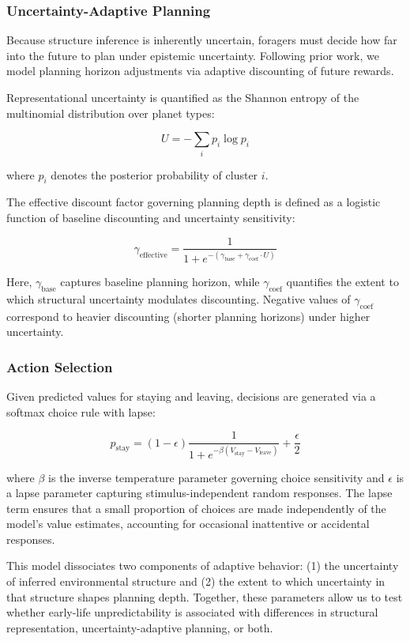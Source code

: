 \documentclass[12pt]{article}
\begin{document}
\subsubsection*{Uncertainty-Adaptive Planning}

Because structure inference is inherently uncertain, foragers must decide how far into the future to plan under epistemic uncertainty. Following prior work, we model planning horizon adjustments via adaptive discounting of future rewards.

Representational uncertainty is quantified as the Shannon entropy of the multinomial distribution over planet types:

\[
U = -\sum_i p_i \log p_i
\]

where \(p_i\) denotes the posterior probability of cluster \(i\).

The effective discount factor governing planning depth is defined as a logistic function of baseline discounting and uncertainty sensitivity:

\[
\gamma_{\text{effective}} =
\frac{1}{1 + e^{-(\gamma_{\text{base}} + \gamma_{\text{coef}} \cdot U)}}
\]

Here, \(\gamma_{\text{base}}\) captures baseline planning horizon, while \(\gamma_{\text{coef}}\) quantifies the extent to which structural uncertainty modulates discounting. Negative values of \(\gamma_{\text{coef}}\) correspond to heavier discounting (shorter planning horizons) under higher uncertainty.

\subsubsection*{Action Selection}

Given predicted values for staying and leaving, decisions are generated via a softmax choice rule with lapse:

\[
p_{\text{stay}} =
(1-\epsilon)
\frac{1}{1 + e^{-\beta (V_{\text{stay}} - V_{\text{leave}})}}
+
\frac{\epsilon}{2}
\]

where \(\beta\) is the inverse temperature parameter governing choice sensitivity and \(\epsilon\) is a lapse parameter capturing stimulus-independent random responses. The lapse term ensures that a small proportion of choices are made independently of the model's value estimates, accounting for occasional inattentive or accidental responses.

This model dissociates two components of adaptive behavior: (1) the uncertainty of inferred environmental structure and (2) the extent to which uncertainty in that structure shapes planning depth. Together, these parameters allow us to test whether early-life unpredictability is associated with differences in structural representation, uncertainty-adaptive planning, or both.
\end{document}
